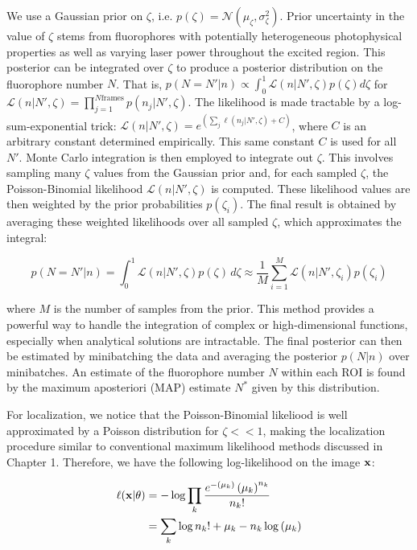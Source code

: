 We use a Gaussian prior on $\zeta$, i.e. $p(\zeta) = \mathcal{N}(\mu_{\zeta},\sigma_{\zeta}^2)$. Prior uncertainty in the value of $\zeta$ stems from fluorophores with potentially heterogeneous photophysical properties as well as varying laser power throughout the excited region. This posterior can be integrated over $\zeta$ to produce a posterior distribution on the fluorophore number $N$. That is, $p(N=N'\lvert n) \propto \int_{0}^{1} \mathcal{L}(n\lvert N',\zeta)p(\zeta) d\zeta$ for $\mathcal{L}(n\lvert N',\zeta)=\prod_{j=1}^{N\mathrm{frames}} p(n_{j}\lvert N',\zeta)$. The likelihood is made tractable by a log-sum-exponential trick: $\mathcal{L}(n\lvert N',\zeta) = e^{\left(\sum_{j}\ell (n_{j}\lvert N',\zeta) + C\right)}$, where $C$ is an arbitrary constant determined empirically. This same constant $C$ is used for all $N'$. Monte Carlo integration is then employed to integrate out $\zeta$. This involves sampling many $\zeta$ values from the Gaussian prior and, for each sampled $\zeta$, the Poisson-Binomial likelihood $\mathcal{L}(n\lvert N',\zeta)$ is computed. These likelihood values are then weighted by the prior probabilities $p(\zeta_i)$. The final result is obtained by averaging these weighted likelihoods over all sampled $\zeta$, which approximates the integral:

\begin{equation*}
p(N=N'\lvert n) = \int_{0}^{1} \mathcal{L}(n\lvert N',\zeta) p(\zeta) \, d\zeta \approx \frac{1}{M} \sum_{i=1}^M \mathcal{L}(n\lvert N',\zeta_i) p(\zeta_i)
\end{equation*}

where $M$ is the number of samples from the prior. This method provides a powerful way to handle the integration of complex or high-dimensional functions, especially when analytical solutions are intractable. The final posterior can then be estimated by minibatching the data and averaging the posterior $p(N\lvert n)$ over minibatches. An estimate of the fluorophore number $N$ within each ROI is found by the maximum aposteriori (MAP) estimate $N^{*}$ given by this distribution.

For localization, we notice that the Poisson-Binomial likeliood is well approximated by a Poisson distribution for $\zeta << 1$, making the localization procedure similar to conventional maximum likelihood methods discussed in Chapter 1. Therefore, we have the following log-likelihood on the image $\bold{x}$:


\begin{align}
\ell(\bold{x}\lvert \theta) &= -\log \prod_{k} \frac{e^{-\left(\mu_{k}\right)}\left(\mu_{k}\right)^{n_k}}{n_k!}\\
&= \sum_{k}  \log n_k! + \mu_{k} - n_k\log\left(\mu_{k}\right)
\end{align}

